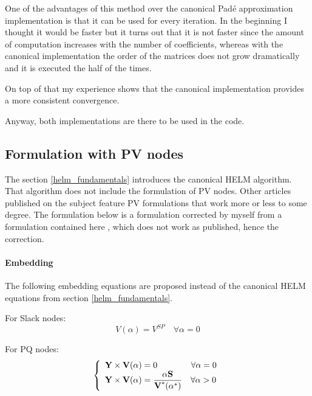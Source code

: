 \documentclass[nols,a4paper,twoside,notoc,fleqn]{tufte-book}
\begin{document}
One of the advantages of this method over the canonical Pad\'e approximation implementation is that it can be used for every iteration. In the beginning I thought it would be faster but it turns out that it is not faster since the amount of computation increases with the number of coefficients, whereas with the canonical implementation the order of the matrices does not grow dramatically and it is executed the half of the times.

On top of that my experience shows that the canonical implementation provides a more consistent convergence.

Anyway, both implementations are there to be used in the code.




\subsection{Formulation with PV nodes}

The section \ref{helm_fundamentals} introduces the canonical HELM algorithm. That algorithm does not include the formulation of PV nodes.
Other articles published on the subject feature PV formulations that work more or less to some degree. The formulation below is a formulation corrected by myself from a formulation contained here \cite{liu2017online}, which does not work as published, hence the correction.



\paragraph{Embedding}

The following embedding equations are proposed instead of the canonical HELM equations from section \ref{helm_fundamentals}.

For Slack nodes:
\begin{equation}
V(\alpha) = V^{SP} \quad \forall \alpha=0
\end{equation}

For PQ nodes:
\begin{equation}
\left\{
\begin{array}{ll}
\textbf{Y} \times \textbf{V}(\alpha) = 0 \quad \quad \quad \quad \forall \alpha=0\\
\mathlarger{\textbf{Y} \times \textbf{V}(\alpha) = \frac{\alpha \textbf{S}}{\textbf{V}^*(\alpha^*)}} \quad \forall \alpha>0
\end{array}
\right.
\end{equation}
\end{document}
